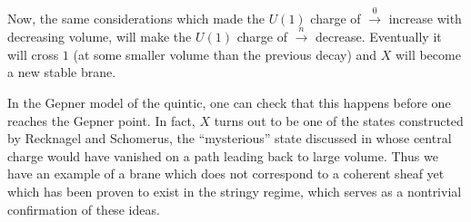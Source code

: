 \documentclass[a4paper,12pt]{amsart}
\numberwithin{equation}{section}
\theoremstyle{plain}
\theoremstyle{definition}
\def\mapr{\mathop{\longrightarrow}\limits}
\begin{document}
Now, the same considerations which made the $U(1)$ charge of $\mapr^0$
increase with decreasing volume, will make the $U(1)$ charge of $\mapr^n$
decrease.  Eventually it will cross $1$ (at some smaller volume
than the previous decay) and $X$ will become a new stable brane.

In the Gepner model of the quintic, one can check that this happens
before one reaches the Gepner point.  In fact, $X$ turns out to be one
of the states constructed by Recknagel and Schomerus, the
``mysterious'' state discussed in \cite{Doug,Denef} whose central
charge would have vanished on a path leading back to large volume.
Thus we have an example of a brane which does not correspond to a
coherent sheaf yet which has been proven to exist in the stringy
regime, which serves as a nontrivial confirmation of these ideas.
\end{document}
